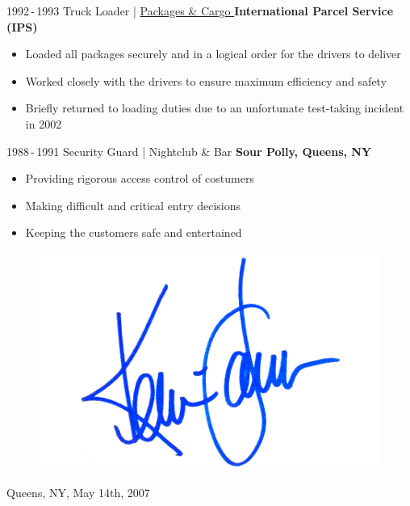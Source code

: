 \documentclass[]{friggeri-cv_reccius-experiment}
\begin{document}
\begin{entrylist}
  \entry
    {1992\,-\,1993\enspace}
    {Truck Loader | }{\href{https://kingofqueens.fandom.com/de/wiki/International_Parcel_Service}{\small Packages \& Cargo \faMousePointer}}
    {\normalsize\textbf{\color{ipsgreen}\faMapMarker\space International Parcel Service (IPS)}}
    {\jobspace
    \begin{itemize}[leftmargin=*, noitemsep]
    \item Loaded all packages securely and in a logical order for the drivers to deliver
    \item Worked closely with the drivers to ensure maximum efficiency and safety
    \item Briefly returned to loading duties due to an unfortunate test-taking incident in 2002 \\
    \end{itemize}
    }

  \entry
    {1988\,-\,1991\enspace}
    {Security Guard  | }{\small Nightclub \& Bar}
    {\normalsize\textbf{\color{ipsgreen}\faMapMarker\space Sour Polly, Queens, NY}}
    {\jobspace
    \begin{itemize}[leftmargin=*, itemsep = 0.1em]
    \item Providing rigorous access control of costumers
    \item Making difficult and critical entry decisions
    \item Keeping the customers safe and entertained\\
    \end{itemize}
    }
    
\end{entrylist}

\vspace{-12.5mm}
\begin{figure}[H]
\hspace{11cm}
\includegraphics[scale=0.5]{img/KevinJamesSignature.jpg}
\end{figure}
\vspace{-1.05cm}
\hspace{6.5cm} Queens, NY, May 14th, 2007
\end{document}
